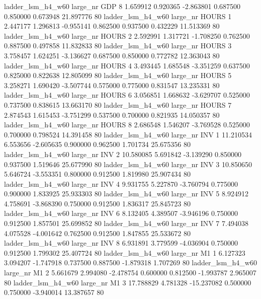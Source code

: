   ladder_lsm_h4_w60   large_nr      GDP                 8  1.659912  0.920365  -2.863801 0.687500 0.850000  0.673948   21.897776 80
  ladder_lsm_h4_w60   large_nr    HOURS                 1  2.447177  1.296813  -0.955141 0.862500 0.937500  0.432229   11.513369 80
  ladder_lsm_h4_w60   large_nr    HOURS                 2  2.592991  1.317721  -1.708250 0.762500 0.887500  0.497858   11.832833 80
  ladder_lsm_h4_w60   large_nr    HOURS                 3  3.758457  1.624251  -3.136627 0.687500 0.850000  0.772782   12.363043 80
  ladder_lsm_h4_w60   large_nr    HOURS                 4  3.493445  1.685548  -3.351259 0.637500 0.825000  0.822638   12.805099 80
  ladder_lsm_h4_w60   large_nr    HOURS                 5  3.258271  1.690420  -3.507744 0.575000 0.775000  0.831547   13.235331 80
  ladder_lsm_h4_w60   large_nr    HOURS                 6  3.056851  1.668632  -3.629707 0.525000 0.737500  0.838615   13.663170 80
  ladder_lsm_h4_w60   large_nr    HOURS                 7  2.874543  1.615453  -3.751299 0.537500 0.700000  0.821935   14.050357 80
  ladder_lsm_h4_w60   large_nr    HOURS                 8  2.686548  1.546207  -3.769528 0.525000 0.700000  0.798524   14.391458 80
  ladder_lsm_h4_w60   large_nr      INV                 1 11.210534  6.553656  -2.605635 0.900000 0.962500  1.701734   25.675356 80
  ladder_lsm_h4_w60   large_nr      INV                 2 10.580085  5.691842  -3.139290 0.850000 0.937500  1.519646   25.677990 80
  ladder_lsm_h4_w60   large_nr      INV                 3 10.850650  5.646724  -3.553351 0.800000 0.912500  1.819980   25.907434 80
  ladder_lsm_h4_w60   large_nr      INV                 4  9.931755  5.227870  -3.760794 0.775000 0.900000  1.833925   25.933303 80
  ladder_lsm_h4_w60   large_nr      INV                 5  8.924912  4.758691  -3.868390 0.750000 0.912500  1.836317   25.845723 80
  ladder_lsm_h4_w60   large_nr      INV                 6  8.132405  4.389507  -3.946196 0.750000 0.912500  1.857501   25.699852 80
  ladder_lsm_h4_w60   large_nr      INV                 7  7.494038  4.075528  -4.001642 0.762500 0.912500  1.847855   25.533672 80
  ladder_lsm_h4_w60   large_nr      INV                 8  6.931891  3.779599  -4.036904 0.750000 0.912500  1.799302   25.407724 80
  ladder_lsm_h4_w60   large_nr       M1                 1  6.127323  3.094207  -1.747918 0.737500 0.887500 -1.879318    1.707269 80
  ladder_lsm_h4_w60   large_nr       M1                 2  5.661679  2.994080  -2.478754 0.600000 0.812500 -1.993787    2.965007 80
  ladder_lsm_h4_w60   large_nr       M1                 3 17.788829  4.781328 -15.237082 0.500000 0.750000 -3.940014   13.387657 80

